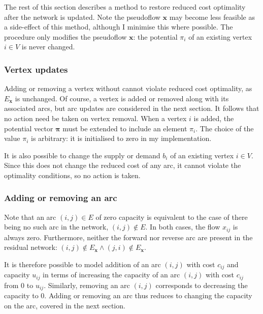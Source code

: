The rest of this section describes a method to restore reduced cost optimality after the network is updated. Note the pseudoflow $\mathbf{x}$ may become less feasible as a side-effect of this method, although I minimise this where possible. The procedure only modifies the pseudoflow $\mathbf{x}$: the potential $\pi_i$ of an existing vertex $i \in V$ is never changed.

\subsubsection{Vertex updates}

Adding or removing a vertex without cannot violate reduced cost optimality, as $E_\mathbf{x}$ is unchanged. Of course, a vertex is added or removed along with its associated arcs\footnotemark, but arc updates are considered in the next section. It follows that no action need be taken on vertex removal. When a vertex $i$ is added, the potential vector $\boldsymbol{\pi}$ must be extended to include an element $\pi_i$. The choice of the value $\pi_i$ is arbitrary: it is initialised to zero in my implementation.

It is also possible to change the supply or demand $b_i$ of an existing vertex $i \in V$\footnotemark. Since this does not change the reduced cost of any arc, it cannot violate the optimality conditions, so no action is taken.

\subsubsection{Adding or removing an arc}

Note that an arc $(i,j) \in E$ of zero capacity is equivalent to the case of there being no such arc in the network, $(i,j) \not \in E$. In both cases, the flow $x_{ij}$ is always zero. Furthermore, neither the forward nor reverse arc are present in the residual network: $(i,j) \not \in E_\mathbf{x} \land (j,i) \not \in E_\mathbf{x}$.

It is therefore possible to model addition of an arc $(i,j)$ with cost $c_{ij}$ and capacity $u_{ij}$ in terms of increasing the capacity of an arc $(i,j)$ with cost $c_{ij}$ from $0$ to $u_{ij}$. Similarly, removing an arc $(i,j)$ corresponds to decreasing the capacity to $0$. Adding or removing an arc thus reduces to changing the capacity on the arc, covered in the next section.

